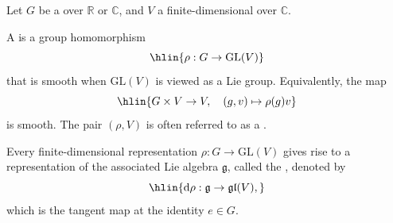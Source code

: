 \begin{definition} \label{definition:representation_of_a_lie_group_on_a_topological_vector_space}

    Let $G$ be a  over $\mathbb{R}$ or $\mathbb{C}$, and $V$ a finite-dimensional  over $\mathbb{C}$.

    A  is a group homomorphism
    $$\hlin{\rho : G \to \mathrm{GL}(V)}$$
    that is smooth when $\mathrm{GL}(V)$ is viewed as a Lie group. Equivalently, the map
    $$\hlin{G \times V \to V, \quad (g, v) \mapsto \rho(g)v}$$
    is smooth. The pair $(\rho, V)$ is often referred to as a .

    Every finite-dimensional representation $\rho : G \to \mathrm{GL}(V)$ gives rise to a representation of the associated Lie algebra $\mathfrak{g}$, called the , denoted by
    $$\hlin{\mathrm{d}\rho : \mathfrak{g} \to \mathfrak{gl}(V),}$$
    which is the tangent map at the identity $e \in G$.
\end{definition}
